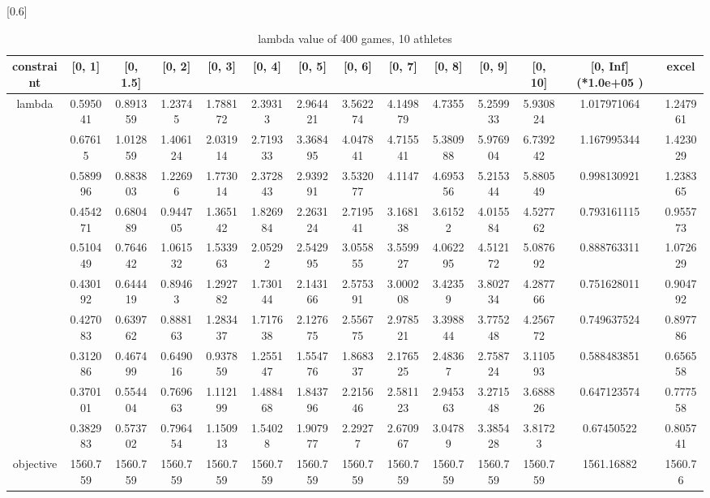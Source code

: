 \documentclass[
journal=jacsat, %
manuscript=article]{achemso}
\begin{document}
\begin{table}[htbp]
  \centering
  \caption{lambda value of 400 games, 10 athletes}
   \scalebox{0.6}[0.6]{%
    \begin{tabular}{cccccccccccccc}
    \toprule
    constraint & [0, 1] & [0, 1.5] & [0, 2] & [0, 3] & [0, 4] & [0, 5] & [0, 6] & [0, 7] & [0, 8] & [0, 9] & [0, 10] & [0, Inf] (*1.0e+05 ) & excel \\
    \hline
    \multirow{10}[0]{*}{lambda} & 0.595041 & 0.891359 & 1.23745 & 1.788172 & 2.39313 & 2.964421 & 3.562274 & 4.149879 & 4.7355 & 5.259933 & 5.930824 & 1.017971064 & 1.247961 \\
          & 0.67615 & 1.012859 & 1.406124 & 2.031914 & 2.719333 & 3.368495 & 4.047841 & 4.715541 & 5.380988 & 5.976904 & 6.739242 & 1.167995344 & 1.423029 \\
          & 0.589996 & 0.883803 & 1.22696 & 1.773014 & 2.372843 & 2.939291 & 3.532077 & 4.1147 & 4.695356 & 5.215344 & 5.880549 & 0.998130921 & 1.238365 \\
          & 0.454271 & 0.680489 & 0.944705 & 1.365142 & 1.826984 & 2.263124 & 2.719541 & 3.168138 & 3.61522 & 4.015584 & 4.527762 & 0.793161115 & 0.955773 \\
          & 0.510449 & 0.764642 & 1.061532 & 1.533963 & 2.05292 & 2.542995 & 3.055855 & 3.559927 & 4.062295 & 4.512172 & 5.087692 & 0.888763311 & 1.072629 \\
          & 0.430192 & 0.644419 & 0.89463 & 1.292782 & 1.730144 & 2.143166 & 2.575391 & 3.000208 & 3.42359 & 3.802734 & 4.287766 & 0.751628011 & 0.904792 \\
          & 0.427083 & 0.639762 & 0.888163 & 1.283437 & 1.717638 & 2.127675 & 2.556775 & 2.978521 & 3.398844 & 3.775248 & 4.256772 & 0.749637524 & 0.897786 \\
          & 0.312086 & 0.467499 & 0.649016 & 0.937859 & 1.255147 & 1.554776 & 1.868337 & 2.176525 & 2.48367 & 2.758724 & 3.110593 & 0.588483851 & 0.656558 \\
          & 0.370101 & 0.554404 & 0.769663 & 1.112199 & 1.488468 & 1.843796 & 2.215646 & 2.581123 & 2.945363 & 3.271548 & 3.688826 & 0.647123574 & 0.777558 \\
          & 0.382983 & 0.573702 & 0.796454 & 1.150913 & 1.54028 & 1.907977 & 2.29277 & 2.670967 & 3.04789 & 3.385428 & 3.81723 & 0.67450522 & 0.805741 \\
    objective & 1560.759 & 1560.759 & 1560.759 & 1560.759 & 1560.759 & 1560.759 & 1560.759 & 1560.759 & 1560.759 & 1560.759 & 1560.759 & 1561.16882 & 1560.76 \\
    \hline
    \end{tabular}%
    }
  \label{tab:addlabel}%
\end{table}%
\end{document}
